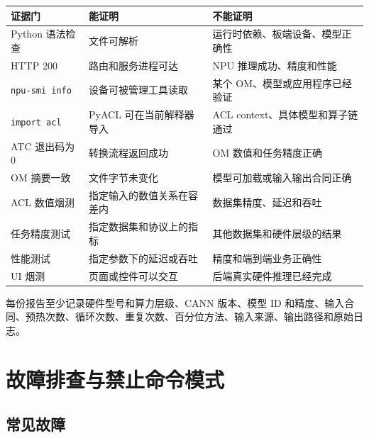 \begin{longtable}[]{@{}
  >{\raggedright\arraybackslash}p{}
  >{\raggedright\arraybackslash}p{}
  >{\raggedright\arraybackslash}p{}@{}}
\toprule\noalign{}
\begin{minipage}[b]{\linewidth}\raggedright
证据门
\end{minipage} & \begin{minipage}[b]{\linewidth}\raggedright
能证明
\end{minipage} & \begin{minipage}[b]{\linewidth}\raggedright
不能证明
\end{minipage} \\
\midrule\noalign{}
\endhead
\bottomrule\noalign{}
\endlastfoot
Python 语法检查 & 文件可解析 & 运行时依赖、板端设备、模型正确性 \\
HTTP 200 & 路由和服务进程可达 & NPU 推理成功、精度和性能 \\
\passthrough{\lstinline!npu-smi info!} & 设备可被管理工具读取 & 某个
OM、模型或应用程序已经验证 \\
\passthrough{\lstinline!import acl!} & PyACL 可在当前解释器导入 & ACL
context、具体模型和算子链通过 \\
ATC 退出码为 0 & 转换流程返回成功 & OM 数值和任务精度正确 \\
OM 摘要一致 & 文件字节未变化 & 模型可加载或输入输出合同正确 \\
ACL 数值烟测 & 指定输入的数值关系在容差内 & 数据集精度、延迟和吞吐 \\
任务精度测试 & 指定数据集和协议上的指标 & 其他数据集和硬件层级的结果 \\
性能测试 & 指定参数下的延迟或吞吐 & 精度和端到端业务正确性 \\
UI 烟测 & 页面或控件可以交互 & 后端真实硬件推理已经完成 \\
\end{longtable}

每份报告至少记录硬件型号和算力层级、CANN 版本、模型 ID
和精度、输入合同、预热次数、循环次数、重复次数、百分位方法、输入来源、输出路径和原始日志。

\section{故障排查与禁止命令模式}\label{ux6545ux969cux6392ux67e5ux4e0eux7981ux6b62ux547dux4ee4ux6a21ux5f0f}

\subsection{常见故障}\label{ux5e38ux89c1ux6545ux969c}

